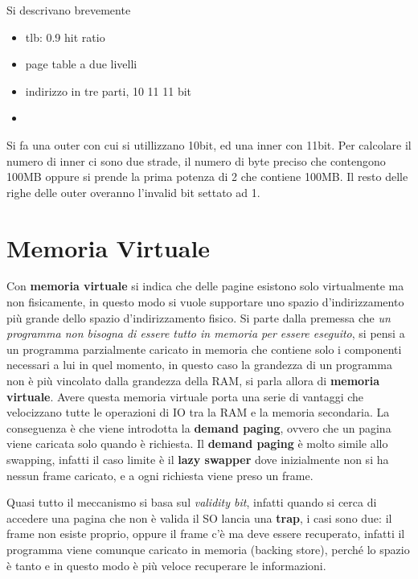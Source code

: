 \documentclass[12pt]{article}
\begin{document}
\begin{example}{}{}
  Si descrivano brevemente 
  \begin{itemize}
    \item tlb: 0.9 hit ratio
    \item page table a due livelli
    \item indirizzo in tre parti, 10 11 11 bit
    \item 
  \end{itemize}
  Si fa una outer con cui si utillizzano 10bit, ed una inner con 11bit. Per calcolare il numero di inner ci sono due strade, il numero di byte preciso che contengono 100MB oppure si prende la prima potenza di 2 che contiene 100MB. Il resto delle righe delle outer overanno l'invalid bit settato ad 1.
\end{example}



\newpage
\section{Memoria Virtuale}
Con \textbf{memoria virtuale} si indica che delle pagine esistono solo virtualmente ma non fisicamente, in questo modo si vuole supportare uno spazio d'indirizzamento pi\`u grande dello spazio d'indirizzamento fisico. Si parte dalla premessa che \emph{un programma non bisogna di essere tutto in memoria per essere eseguito}, si pensi a un programma parzialmente caricato in memoria che contiene solo i componenti necessari a lui in quel momento, in questo caso la grandezza di un programma non \`e pi\`u vincolato dalla grandezza della RAM, si parla allora di \textbf{memoria virtuale}. Avere questa memoria virtuale porta una serie di vantaggi che velocizzano tutte le operazioni di IO tra la RAM e la memoria secondaria. La conseguenza \`e che viene introdotta la \textbf{demand paging}, ovvero che un pagina viene caricata solo quando \`e richiesta. Il \textbf{demand paging} \`e molto simile allo swapping, infatti il caso limite \`e il \textbf{lazy swapper} dove inizialmente non si ha nessun frame caricato, e a ogni richiesta viene preso un frame.


Quasi tutto il meccanismo si basa sul \emph{validity bit}, infatti quando si cerca di accedere una pagina che non \`e valida il SO lancia una \textbf{trap}, i casi sono due: il frame non esiste proprio, oppure il frame c'\`e ma deve essere recuperato, infatti il programma viene comunque caricato in memoria (backing store), perch\'e lo spazio \`e tanto e in questo modo \`e pi\`u veloce recuperare le informazioni.
\end{document}
